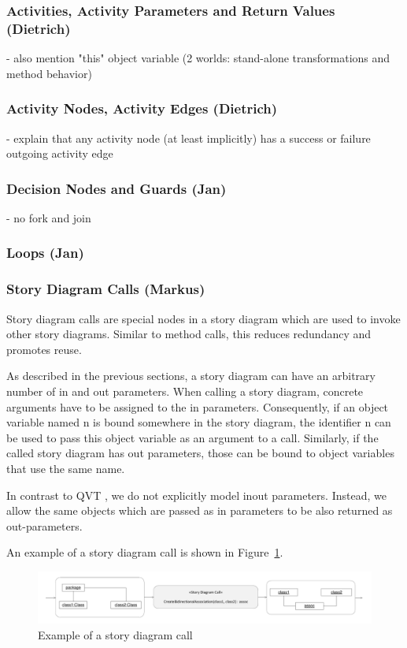 \subsubsection{Activities, Activity Parameters and Return Values (Dietrich)}
- also mention "this" object variable (2 worlds: stand-alone transformations and method behavior)

\subsubsection{Activity Nodes, Activity Edges (Dietrich)}
- explain that any activity node (at least implicitly) has a success or failure outgoing activity edge

\subsubsection{Decision Nodes and Guards (Jan)}
- no fork and join

\subsubsection{Loops (Jan)}

\subsubsection{Story Diagram Calls (Markus)}

Story diagram calls are special nodes in a story diagram which are used to invoke other story diagrams. Similar to method calls, this reduces redundancy and promotes reuse.

As described in the previous sections, a story diagram can have an arbitrary number of in and out parameters. When calling a story diagram, concrete arguments have to be assigned to the in parameters. Consequently, if an object variable named n is bound somewhere in the story diagram, the identifier n can be used to pass this object variable as an argument to a call. Similarly, if the called story diagram has out parameters, those can be bound to object variables that use the same name.

In contrast to QVT \cite{QVT}, we do not explicitly model inout parameters. Instead, we allow the same objects which are passed as in parameters to be also returned as out-parameters.

An example of a story diagram call is shown in Figure~\ref{fig:call}.

\begin{figure}[htb]
\begin{center}
  \includegraphics[width=\textwidth]{figures/StoryDiagramCall}
  \caption{Example of a story diagram call}
  \label{fig:call}
\end{center}
\end{figure}


